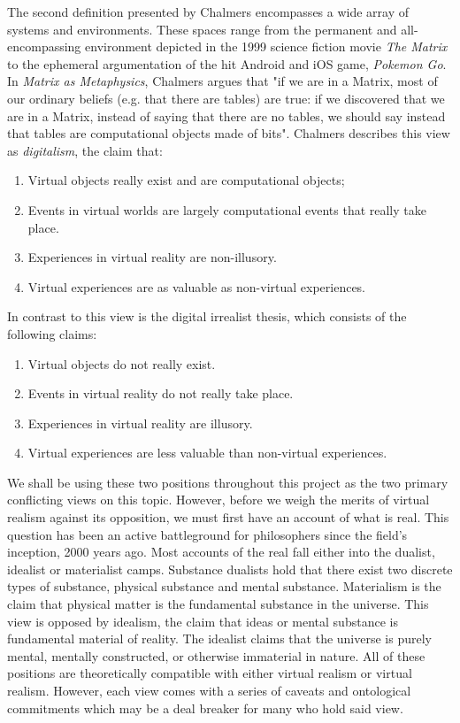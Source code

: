 The second definition presented by Chalmers encompasses a wide array of systems and environments. These spaces range from the permanent and all-encompassing environment depicted in the 1999 science fiction movie \textit{The Matrix} to the ephemeral argumentation of the hit Android and iOS game, \textit{Pokemon Go}. In \textit{Matrix as Metaphysics}, Chalmers argues that "if we are in a Matrix, most of our ordinary beliefs (e.g. that there are tables) are true: if we discovered that we are in a Matrix, instead of saying that there are no tables, we should say instead that tables are computational objects made of bits". Chalmers describes this view as \textit{digitalism}, the claim that: \begin{enumerate}
	\item Virtual objects really exist and are computational objects;
\item Events in virtual worlds are largely computational events that really take place. \item Experiences in virtual reality are non-illusory.
\item Virtual experiences are as valuable as non-virtual experiences. \end{enumerate} In contrast to this view is the digital irrealist thesis, which consists of the following claims: \begin{enumerate}
\item Virtual objects do not really exist.
\item Events in virtual reality do not really take place.
\item Experiences in virtual reality are illusory.
\item Virtual experiences are less valuable than non-virtual experiences.
\end{enumerate} \cite{ChalmersVR} We shall be using these two positions throughout this project as the two primary conflicting views on this topic. However, before we weigh the merits of virtual realism against its opposition, we must first have an account of what is real. This question has been an active battleground for philosophers since the field's inception, 2000 years ago. Most accounts of the real fall either into the dualist, idealist or materialist camps. Substance dualists hold that there exist two discrete types of substance, physical substance and mental substance.  Materialism is the claim that physical matter is the fundamental substance in the universe. This view is opposed by idealism, the claim that ideas or mental substance is fundamental material of reality. The idealist claims that the universe is purely mental, mentally constructed, or otherwise immaterial in nature. All of these positions are theoretically compatible with either virtual realism or virtual realism. However, each view comes with a series of caveats and ontological commitments which may be a deal breaker for many who hold said view.
